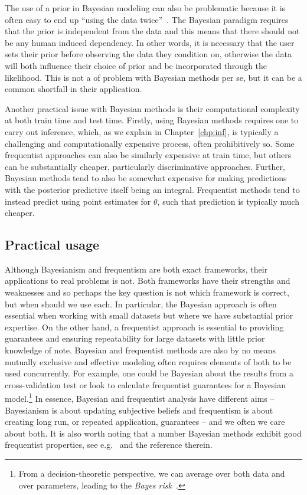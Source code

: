 The use of a prior in Bayesian modeling can also be problematic because it is often easy to end up 
``using the data twice''~\citep{gelman2008objections}.  The Bayesian paradigm requires that the
prior is independent from the data and this means that there should not be any human induced
dependency.  In other words, it is necessary that the user sets their prior before
observing the data they condition on, otherwise the data will both influence their choice of prior
and be incorporated through the likelihood.  This is not a of problem with Bayesian 
methods per se, but it can be a common shortfall in their application.

Another practical issue with Bayesian methods is their computational complexity at both
train time and test time.  Firstly, using Bayesian methods requires one to carry out inference,
which, as we explain in Chapter~\ref{chp:inf}, is typically a challenging and computationally
expensive process, often prohibitively so.  Some frequentist approaches can also
be similarly expensive at train time, but others can be substantially cheaper, particularly
discriminative approaches.  Further, Bayesian methods tend to also be somewhat expensive
for making predictions with the posterior predictive itself being an integral.  Frequentist
methods tend to instead predict using point estimates for $\theta$, such that prediction is typically
much cheaper.

\subsection{Practical usage}
\label{sec:bayes:religion:correct}

Although Bayesianism and frequentism are both exact frameworks, their applications to real problems is not.
Both frameworks have their strengths and weaknesses and so perhaps the key question is not which framework
is correct, but when should we use each.  In
particular, the Bayesian approach is often essential when working with small datasets but where we have substantial
prior expertise.  On the other hand, a frequentist approach is essential to providing guarantees and ensuring repeatability for large
datasets with little prior knowledge of note.  Bayesian and frequentist methods are also by no means mutually 
exclusive and effective modeling often requires elements of both
to be used concurrently.  
For example, one could be Bayesian about the results from a cross-validation test or look to calculate
frequentist guarantees for a Bayesian model.\footnote{From a decision-theoretic perspective, we can
average over both data and over parameters, leading to the \emph{Bayes risk}~\citep{robert2007bayesian}.}
In essence, Bayesian and frequentist analysis have different aims -- Bayesianism is about updating
subjective beliefs and frequentism is about creating long run, or repeated application, guarantees -- 
and we often we care about both.  It is also worth noting that a number Bayesian methods exhibit
good frequentist properties, see e.g.~\cite{mcallester2013pac} and the reference therein.

